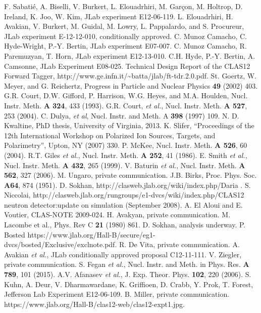 \documentclass[a4paper,12pt]{report}
\begin{document}
\begin{thebibliography}{99}
 F. Sabati\'e, A. Biselli, V. Burkert, L. Elouadrhiri, M. Gar\c{c}on, M. Holtrop, D. Ireland, K. Joo, W. Kim, JLab experiment E12-06-119.
  L. Elouadrhiri, H. Avakian, V. Burkert, M. Guidal, M. Lowry, L. Pappalardo, and S. Procureur, JLab experiment E-12-12-010, conditionally approved.
 C. Munoz Camacho, C. Hyde-Wright, P.-Y. Bertin, JLab experiment E07-007.
 C. Munoz Camacho, R. Paremuzyan, T. Horn, JLab experiment E12-13-010. 
 C.H. Hyde, P.-Y. Bertin, A. Camsonne, JLab Experiment E08-025.
 Technical Design Report of the CLAS12 Forward Tagger, {\rm http://www.ge.infn.it/\textasciitilde batta/jlab/ft-tdr.2.0.pdf}.
 St. Goertz, W. Meyer, and G. Reichertz, Progress in Particle and Nuclear Physics {\bf 49} (2002) 403.
 G.R. Court, D.W. Gifford, P. Harrison, W.G. Heyes, and M.A. Houlden, Nucl. Instr. Meth. {\bf A 324}, 433 (1993). 
 G.R. Court, {\it et al.}, Nucl. Instr. Meth. {\bf A 527}, 253 (2004).
  C. Dulya, {\it et al}, Nucl. Instr. and Meth. A \textbf{398} (1997) 109.
 N. D. Kwaltine, PhD thesis, University of Virginia, 2013.
 K. Slifer, ``Proceedings of the 12th International Workshop on Polarized Ion Sources, Targets, and Polarimetry'', Upton, NY (2007) 330.
 P. McKee, Nucl. Instr. Meth. {\bf A 526}, 60 (2004).
 R.T. Giles {\it et al.}, Nucl. Instr. Meth. {\bf A 252}, 41 (1986).
 E. Smith {\it et al.}, Nucl. Instr. Meth. {\bf A 432}, 265 (1999).
 V. Baturin {\it et al.}, Nucl. Instr. Meth. {\bf A 562}, 327 (2006).
 M. Ungaro, private communication.
 J.B. Birks, Proc. Phys. Soc. {\bf A64}, 874 (1951).
 D. Sokhan, http://clasweb.jlab.org/wiki/index.php/Daria .
 S. Niccolai, {\rm http://clasweb.jlab.org/rungroups/e1-dvcs/wiki/index.php/CLAS12 neutron detector:update on simulation (September 2008)}.
 A. El Aloui and E. Voutier, CLAS-NOTE 2009-024.
 H. Avakyan, private communication.
 M. Lacombe et al., Phys. Rev C {\bf 21} (1980) 861.
 D. Sokhan, analysis underway. 
 P. Bosted {\rm https://www.jlab.org/Hall-B/secure/eg1-dvcs/bosted/Exclusive/exclnote.pdf}.
  R. De Vita, private communication.
 A. Avakian {\it et al.}, JLab conditionally approved proposal C12-11-111. 
 V. Ziegler, private communication.
 S. Fegan {\it et al.}, Nucl. Instr. and Meth. in Phys. Res. {\bf A 789}, 101 (2015).   
 A.V. Afanasev {\it et al.}, J. Exp. Theor. Phys. {\bf 102}, 220 (2006).
 S. Kuhn, A. Deur, V. Dharmawardane, K. Griffioen, D. Crabb, Y. Prok, T. Forest, Jefferson Lab Experiment E12-06-109.
 B. Miller, private communication.
 {\rm https://www.jlab.org/Hall-B/clas12-web/clas12-expt1.jpg}.



\end{thebibliography}
\end{document}
